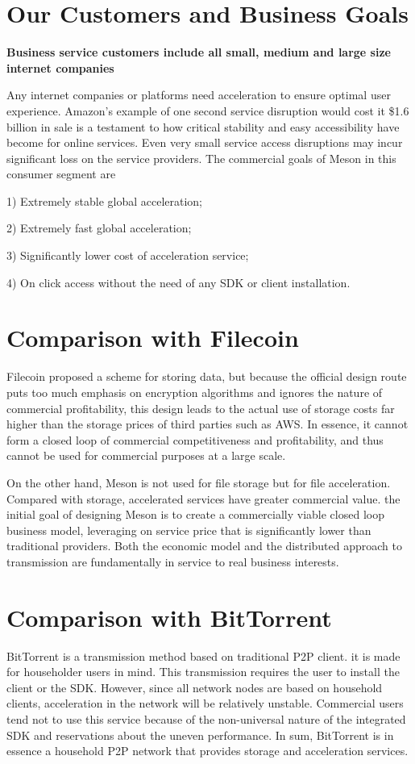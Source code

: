 \documentclass[12pt, a4paper, unicode]{report}
\begin{document}
    \section{Our Customers and Business Goals}
    \textbf{Business service customers include all small, medium and large size internet companies}
    
    Any internet companies or platforms need acceleration to ensure optimal user experience. Amazon's example of one second service disruption would cost it \$1.6 billion in sale is a testament to how critical stability and easy accessibility have become for online services. Even very small service access disruptions may incur significant loss on the service providers. The commercial goals of Meson in this consumer segment are

    
    1) Extremely stable global acceleration;
    
    2) Extremely fast global acceleration;

    3) Significantly lower cost of acceleration service;

    4) On click access without the need of any SDK or client installation.
    
    
    \section{Comparison with Filecoin}
    Filecoin proposed a scheme for storing data, but because the official design route puts too much emphasis on encryption algorithms and ignores the nature of commercial profitability, this design leads to the actual use of storage costs far higher than the storage prices of third parties such as AWS. In essence, it cannot form a closed loop of commercial competitiveness and profitability, and thus cannot be used for commercial purposes at a large scale. 
    
    On the other hand, Meson is not used for file storage but for file acceleration. Compared with storage, accelerated services have greater commercial value. the initial goal of designing Meson is to create a commercially viable closed loop business model, leveraging on service price that is significantly lower than traditional providers. Both the economic model and the distributed approach to transmission are fundamentally in service to real business interests.
    
    \section{Comparison with BitTorrent}
    BitTorrent is a transmission method based on traditional P2P client. it is made for householder users in mind. This transmission requires the user to install the client or the SDK. However, since all network nodes are based on household clients, acceleration in the network will be relatively unstable. Commercial users tend not to use this service because of the non-universal nature of the integrated SDK and reservations about the uneven performance. In sum, BitTorrent is in essence a household P2P network that provides storage and acceleration services.
    
\end{document}
